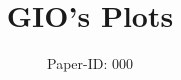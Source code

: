 \documentclass[sigconf,nonacm,screen]{acmart}
\begin{document}
    \title{GIO's Plots}

    \author{Paper-ID: 000}


    \maketitle









\end{document}
